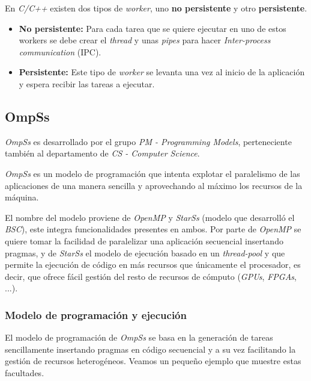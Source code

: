En \textit{C/C++} existen dos tipos de \textit{worker}, uno \textbf{no persistente} y otro \textbf{persistente}. 

\begin{itemize}
 \item \textbf{No persistente:} Para cada tarea que se quiere ejecutar en uno de estos workers se debe crear el \textit{thread} y unas \textit{pipes} para hacer \textit{Inter-process communication} (IPC). %
 \item \textbf{Persistente:} Este tipo de \textit{worker} se levanta una vez al inicio de la aplicación y espera recibir las tareas a ejecutar.
\end{itemize}


\subsection{OmpSs}

\textit{OmpSs} es desarrollado por el grupo \textit{PM - Programming Models}, perteneciente también al departamento de \textit{CS - Computer Science}.
\par\bigskip

\textit{OmpSs} es un modelo de programación que intenta explotar el paralelismo de las aplicaciones de una manera sencilla y aprovechando al máximo los recursos de la máquina\cite{duran2011ompss}. 
\par\bigskip
El nombre del modelo proviene de \textit{OpenMP} y \textit{StarSs} (modelo que desarrolló el \textit{BSC}), este integra funcionalidades presentes en ambos. Por parte de \textit{OpenMP} se quiere tomar la facilidad de paralelizar una aplicación secuencial insertando pragmas, y de \textit{StarSs} el modelo de ejecución basado en un \textit{thread-pool} y que permite la ejecución de código en más recursos que únicamente el procesador, es decir, que ofrece fácil gestión del resto de recursos de cómputo (\textit{GPUs}, \textit{FPGAs}, ...)\cite{sainz2014leveraging}\cite{filgueras2013heterogeneous}.

\subsubsection{Modelo de programación y ejecución}

El modelo de programación de \textit{OmpSs} se basa en la generación de tareas sencillamente insertando pragmas en código secuencial y a su vez facilitando la gestión de recursos heterogéneos. Veamos un pequeño ejemplo que muestre estas facultades.

